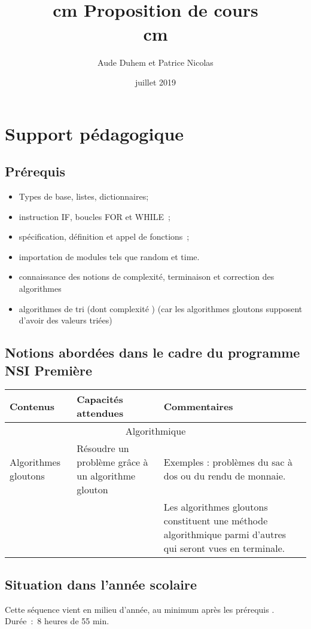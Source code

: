 \documentclass[12pt,french]{report}
\title{\huge{\fbox{Projet de validation du bloc 2} } \\\vskip1 cm Proposition de cours\\\vskip1 cm \huge{\fbox{Thème choisi : les algorithmes gloutons }}}      %
\author{Aude Duhem et Patrice Nicolas}           %
\date{juillet 2019}
\newcounter{sf}
\begin{document}
	\maketitle
\tableofcontents
      \renewcommand{\headrulewidth}{0.5pt}
      \lfoot{                      }
    \pagestyle{fancy}
    \renewcommand{\footrulewidth}{0.4pt}
    \normalsize
\chapter{Support pédagogique}
\section{Prérequis}
\begin{itemize}[$\bullet$]
\item Types de base, listes, dictionnaires;
\item  instruction IF, boucles FOR et WHILE ; 
\item spécification, définition et appel de fonctions ;
\item  importation de modules tels que random et time.
\item connaissance des notions de complexité, terminaison et correction des algorithmes
\item algorithmes de tri (dont complexité ) (car les algorithmes gloutons supposent d'avoir des valeurs triées)
\end{itemize}
\section{Notions abordées dans le cadre du programme NSI Première}
\begin{tabular}{|p{4cm}|p{6cm}|p{8cm}|}
\hline
Contenus&Capacités attendues&Commentaires\\
\hline
\multicolumn{3}{|c|}{Algorithmique}\\
\hline
Algorithmes gloutons&Résoudre un problème grâce à un algorithme glouton& Exemples : problèmes du sac à dos ou du rendu de monnaie.\\
&& Les algorithmes gloutons constituent une méthode algorithmique parmi d'autres qui seront vues en terminale.\\
\hline
	
\end{tabular}
\section{Situation dans l’année scolaire}
Cette séquence vient en milieu d’année, au minimum après les prérequis .\\
  Durée : 8 heures de 55 min.
\end{document}
